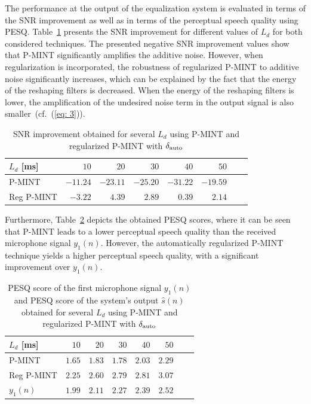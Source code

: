 \documentclass[10pt]{IEEEtran}
\begin{document}
The performance at the output of the equalization system is evaluated in terms of the SNR improvement as well as in terms of the perceptual speech quality using PESQ.
Table~\ref{tbl: snr} presents the SNR improvement for different values of $L_d$ for both considered techniques.
The presented negative SNR improvement values show that P-MINT significantly amplifies the additive noise.
However, when regularization is incorporated, the robustness of regularized P-MINT to additive noise significantly increases, which can be explained by the fact that the energy of the reshaping filters is decreased.
When the energy of the reshaping filters is lower, the amplification of the undesired noise term in the output signal is also smaller~(cf.~(\ref{eq: 3})).
\begin{table}[b!]
\centering
\caption{SNR improvement obtained for several $L_d$ using P-MINT and regularized P-MINT with $\delta_{\rm auto}$}
\label{tbl: snr}
\begin{tabular}{|l|r|r|r|r|r|r|r|}
\hline
$L_d$ [ms] & $10$ & $20$ & $30$ & $40$ & $50$ \\
\hline
P-MINT & $-11.24$ & $-23.11$ & $-25.20$ & $-31.22$ & $-19.59$  \\
\hline
Reg P-MINT & $-3.22$ & $4.39$ & $2.89$ & $0.39$ & $2.14$  \\
\hline
\end{tabular}

\end{table}
Furthermore, Table~\ref{tbl: pesq} depicts the obtained PESQ scores, where it can be seen that P-MINT leads to a lower perceptual speech quality than the received microphone signal $y_1(n)$. 
However, the automatically regularized P-MINT technique yields a higher perceptual speech quality, with a significant improvement over $y_1(n)$.
\begin{table}[t!]
\centering
\caption{PESQ score of the first microphone signal $y_1(n)$ and PESQ score of the system's output $\hat{s}(n)$ obtained for several $L_d$ using P-MINT and regularized P-MINT with $\delta_{\rm auto}$}
\label{tbl: pesq}
\begin{tabular}{|l|r|r|r|r|r|r|r|}
\hline
$L_d$ [ms] & $10$ & $20$ & $30$ & $40$ & $50$ \\
\hline
P-MINT & $1.65$ & $1.83$ & $1.78$ & $2.03$ & $2.29$  \\
\hline
Reg P-MINT & $2.25$ & $2.60$ & $2.79$ & $2.81$ & $3.07$  \\
\hline
$y_1(n)$ & $1.99$ & $2.11$ & $2.27$ & $2.39$ & $2.52$  \\
\hline
\end{tabular}

\end{table}
\end{document}
